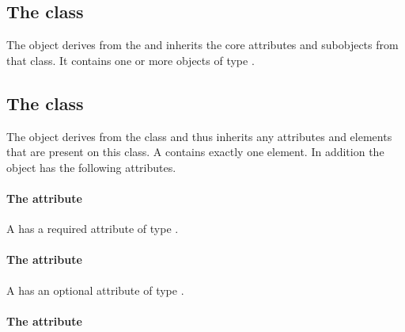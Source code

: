 \subsection{The  class}
\label{listofgroups-class}


The \ListOfGroups object derives from the  and inherits the
core attributes and subobjects from that class. It contains one or more
objects of type \Group.

\subsection{The  class}
\label{group-class}




The \Group object derives from the \SBase class and thus inherits any
attributes and elements that are present on this class.
A \Group contains exactly one \ListOfMembers element.
In addition the \Group object has the following attributes.

\paragraph{The \fixttspace{} attribute}

A \Group has a required attribute  of type
.


\paragraph{The \fixttspace{} attribute}

A \Group has an optional attribute  of type .


\paragraph{The \fixttspace{} attribute}

